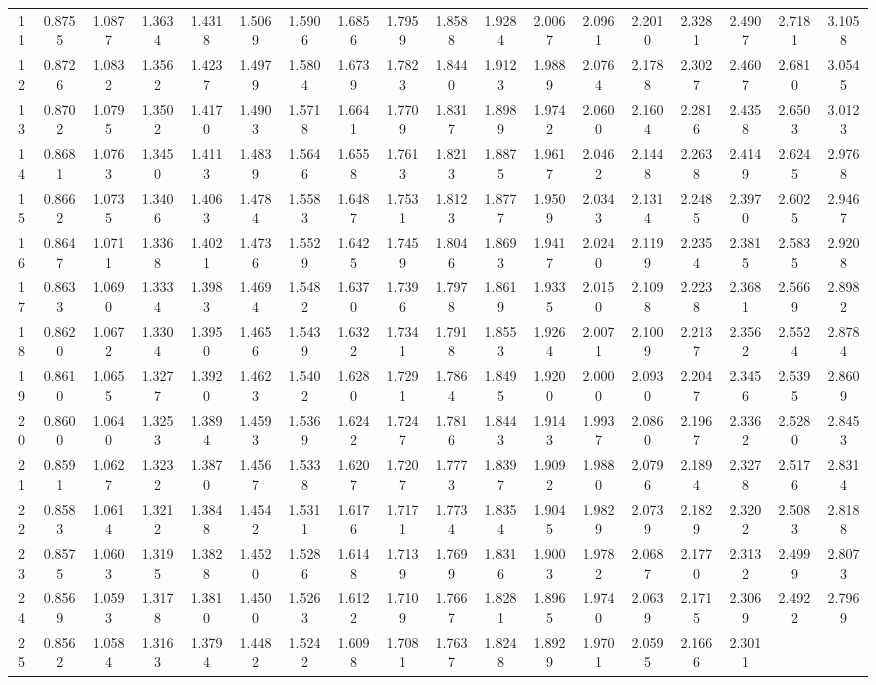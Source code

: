 \begin{table}[H]
\begin{tabular}{c | ccccccccccccccccc}
11&0.8755&1.0877&1.3634&1.4318&1.5069&1.5906&1.6856&1.7959&1.8588&1.9284&2.0067&2.0961&2.2010&2.3281&2.4907&2.7181&3.1058\\
12&0.8726&1.0832&1.3562&1.4237&1.4979&1.5804&1.6739&1.7823&1.8440&1.9123&1.9889&2.0764&2.1788&2.3027&2.4607&2.6810&3.0545\\
13&0.8702&1.0795&1.3502&1.4170&1.4903&1.5718&1.6641&1.7709&1.8317&1.8989&1.9742&2.0600&2.1604&2.2816&2.4358&2.6503&3.0123\\
14&
0.8681&
1.0763&
1.3450&
1.4113&
1.4839&
1.5646&
1.6558&
1.7613&
1.8213&
1.8875&
1.9617&
2.0462&
2.1448&
2.2638&
2.4149&
2.6245&
2.9768\\
15&
0.8662&
1.0735&
1.3406&
1.4063&
1.4784&
1.5583&
1.6487&
1.7531&
1.8123&
1.8777&
1.9509&
2.0343&
2.1314&
2.2485&
2.3970&
2.6025&
2.9467\\
16&
0.8647&
1.0711&
1.3368&
1.4021&
1.4736&
1.5529&
1.6425&
1.7459&
1.8046&
1.8693&
1.9417&
2.0240&
2.1199&
2.2354&
2.3815&
2.5835&
2.9208\\
17&
0.8633&
1.0690&
1.3334&
1.3983&
1.4694&
1.5482&
1.6370&
1.7396&
1.7978&
1.8619&
1.9335&
2.0150&
2.1098&
2.2238&
2.3681&
2.5669&
2.8982\\
18&
0.8620&
1.0672&
1.3304&
1.3950&
1.4656&
1.5439&
1.6322&
1.7341&
1.7918&
1.8553&
1.9264&
2.0071&
2.1009&
2.2137&
2.3562&
2.5524&
2.8784\\
19&
0.8610&
1.0655&
1.3277&
1.3920&
1.4623&
1.5402&
1.6280&
1.7291&
1.7864&
1.8495&
1.9200&
2.0000&
2.0930&
2.2047&
2.3456&
2.5395&
2.8609\\
20&
0.8600&
1.0640&
1.3253&
1.3894&
1.4593&
1.5369&
1.6242&
1.7247&
1.7816&
1.8443&
1.9143&
1.9937&
2.0860&
2.1967&
2.3362&
2.5280&
2.8453\\
21&
0.8591&
1.0627&
1.3232&
1.3870&
1.4567&
1.5338&
1.6207&
1.7207&
1.7773&
1.8397&
1.9092&
1.9880&
2.0796&
2.1894&
2.3278&
2.5176&
2.8314\\
22&
0.8583&
1.0614&
1.3212&
1.3848&
1.4542&
1.5311&
1.6176&
1.7171&
1.7734&
1.8354&
1.9045&
1.9829&
2.0739&
2.1829&
2.3202&
2.5083&
2.8188\\
23&
0.8575&
1.0603&
1.3195&
1.3828&
1.4520&
1.5286&
1.6148&
1.7139&
1.7699&
1.8316&
1.9003&
1.9782&
2.0687&
2.1770&
2.3132&
2.4999&
2.8073\\
24&
0.8569&
1.0593&
1.3178&
1.3810&
1.4500&
1.5263&
1.6122&
1.7109&
1.7667&
1.8281&
1.8965&
1.9740&
2.0639&
2.1715&
2.3069&
2.4922&
2.7969\\
25&
0.8562&
1.0584&
1.3163&
1.3794&
1.4482&
1.5242&
1.6098&
1.7081&
1.7637&
1.8248&
1.8929&
1.9701&
2.0595&
2.1666&
2.3011&

\end{tabular}
\end{table}

